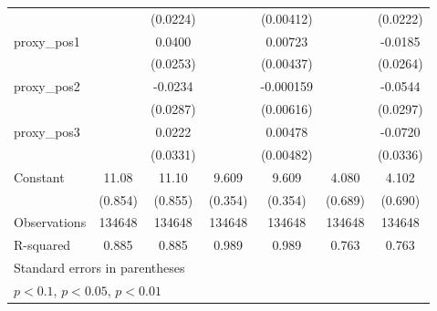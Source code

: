 {\begin{tabular}{l*{6}{c}}
                    &                     &    (0.0224)         &                     &   (0.00412)         &                     &    (0.0222)         \\
\addlinespace
proxy\_pos1          &                     &      0.0400         &                     &     0.00723\sym{*}  &                     &     -0.0185         \\
                    &                     &    (0.0253)         &                     &   (0.00437)         &                     &    (0.0264)         \\
\addlinespace
proxy\_pos2          &                     &     -0.0234         &                     &   -0.000159         &                     &     -0.0544\sym{*}  \\
                    &                     &    (0.0287)         &                     &   (0.00616)         &                     &    (0.0297)         \\
\addlinespace
proxy\_pos3          &                     &      0.0222         &                     &     0.00478         &                     &     -0.0720\sym{**} \\
                    &                     &    (0.0331)         &                     &   (0.00482)         &                     &    (0.0336)         \\
\addlinespace
Constant            &       11.08\sym{***}&       11.10\sym{***}&       9.609\sym{***}&       9.609\sym{***}&       4.080\sym{***}&       4.102\sym{***}\\
                    &     (0.854)         &     (0.855)         &     (0.354)         &     (0.354)         &     (0.689)         &     (0.690)         \\
\midrule
Observations        &      134648         &      134648         &      134648         &      134648         &      134648         &      134648         \\
R-squared           &       0.885         &       0.885         &       0.989         &       0.989         &       0.763         &       0.763         \\
\bottomrule
\multicolumn{7}{l}{\footnotesize Standard errors in parentheses}\\
\multicolumn{7}{l}{\footnotesize \sym{*} \(p<0.1\), \sym{**} \(p<0.05\), \sym{***} \(p<0.01\)}\\
\end{tabular}
}
